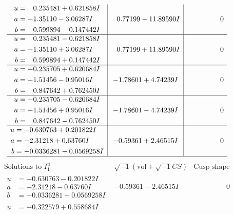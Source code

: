 \documentclass[1p]{elsarticle_modified}
\theoremstyle{definition}
\newcommand{\I}{\sqrt{-1}}
\begin{document}
$$\begin{array}{c|c|c}
\begin{aligned}
u &= \phantom{-}0.235481 + 0.621858 I \\
a &= -1.35110 - 3.06287 I \\
b &= \phantom{-}0.599894 - 0.147442 I\end{aligned}
 & \phantom{-}0.77199 - 11.89590 I & \phantom{-0.000000 } 0 \\ \hline\begin{aligned}
u &= \phantom{-}0.235481 - 0.621858 I \\
a &= -1.35110 + 3.06287 I \\
b &= \phantom{-}0.599894 + 0.147442 I\end{aligned}
 & \phantom{-}0.77199 + 11.89590 I & \phantom{-0.000000 } 0 \\ \hline\begin{aligned}
u &= -0.235705 + 0.620684 I \\
a &= -1.51456 - 0.95016 I \\
b &= \phantom{-}0.847642 + 0.762450 I\end{aligned}
 & -1.78601 + 4.74239 I & \phantom{-0.000000 } 0 \\ \hline\begin{aligned}
u &= -0.235705 - 0.620684 I \\
a &= -1.51456 + 0.95016 I \\
b &= \phantom{-}0.847642 - 0.762450 I\end{aligned}
 & -1.78601 - 4.74239 I & \phantom{-0.000000 } 0 \\ \hline\begin{aligned}
u &= -0.630763 + 0.201822 I \\
a &= -2.31218 + 0.63760 I \\
b &= -0.0336281 - 0.0569258 I\end{aligned}
 & -0.59361 + 2.46515 I & \phantom{-0.000000 } 0\\
 \hline 
 \end{array}$$\newpage$$\begin{array}{c|c|c}  
\text{Solutions to }I^u_{1}& \I (\text{vol} + \sqrt{-1}CS) & \text{Cusp shape}\\
 \hline 
\begin{aligned}
u &= -0.630763 - 0.201822 I \\
a &= -2.31218 - 0.63760 I \\
b &= -0.0336281 + 0.0569258 I\end{aligned}
 & -0.59361 - 2.46515 I & \phantom{-0.000000 } 0 \\ \hline\begin{aligned}
u &= -0.322579 + 0.558684 I \\

\end{aligned}
\end{array}$$
\end{document}
